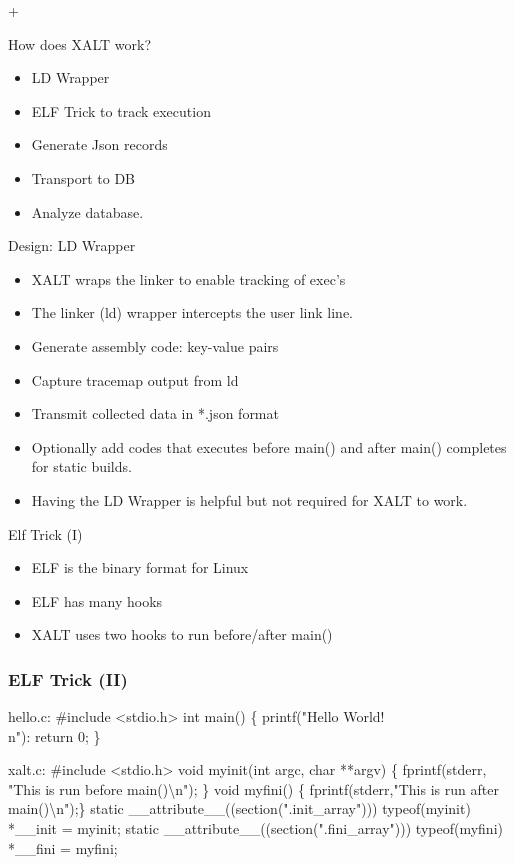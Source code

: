 +\documentclass{beamer}
\begin{document}
\begin{frame}{How does XALT work?}
  \begin{itemize}
    \item LD Wrapper
    \item ELF Trick to track execution
    \item Generate Json records
    \item Transport to DB
    \item Analyze database.
  \end{itemize}
\end{frame}

\begin{frame}{Design: LD Wrapper}
  \begin{itemize}
    \item XALT wraps the linker to enable tracking of exec's
    \item The linker (ld) wrapper intercepts the user link line.
    \item Generate assembly code: key-value pairs
    \item Capture tracemap output from ld
    \item Transmit collected data in *.json format
    \item Optionally add codes that executes before main() and after
      main() completes for static builds.
    \item Having the LD Wrapper is helpful but not required for XALT
      to work.
  \end{itemize}
\end{frame}


\begin{frame}{Elf Trick (I)}
  \begin{itemize}
    \item ELF is the binary format for Linux
    \item ELF has many hooks
    \item XALT uses two hooks to run before/after main()
  \end{itemize}
\end{frame}

\begin{frame}[fragile]
    \frametitle{ELF Trick (II)}
 {\small
    \begin{semiverbatim}
{\color{blue}hello.c}:
#include <stdio.h>
int main() \{ printf("Hello World!\\n"): return 0; \}

{\color{blue}xalt.c}:
#include <stdio.h>
void myinit(int argc, char **argv)
\{ fprintf(stderr, "This is run before main()\textbackslash{}n"); \}
void myfini()
\{ fprintf(stderr,"This is run after main()\textbackslash{}n");\}
static \_\_attribute\_\_((section(".init_array")))
     typeof(myinit) *\_\_init = myinit;
static \_\_attribute\_\_((section(".fini_array")))
     typeof(myfini) *\_\_fini = myfini;
    \end{semiverbatim}
}
\end{frame}
\end{document}
